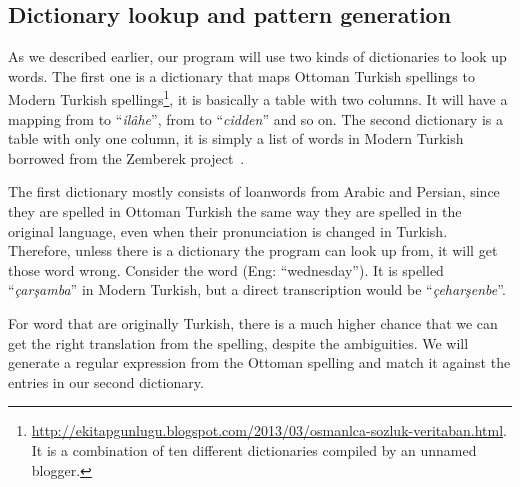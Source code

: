 \documentclass[10pt,twocolumn]{article}
\theoremstyle{nonumberplain}
\newcommand{\otto}[1]{\RLE{\ottoman{}\Large{}#1}}
\newcommand{\word}[1]{``\emph{#1}''}
\begin{document}
\subsection{Dictionary lookup and pattern generation}

As we described earlier, our program will use two kinds of dictionaries to look
up words. The first one is a dictionary that maps Ottoman Turkish spellings to
Modern Turkish spellings\footnote{\url{http://ekitapgunlugu.blogspot.com/2013/03/osmanlca-sozluk-veritaban.html}. It is a combination of ten different dictionaries compiled by an unnamed blogger.}, it is basically a table with two columns.
It will have a mapping from \otto{الهه} to \word{ilâhe}, from \otto{جدا} to
\word{cidden} and so on. The second dictionary is a table with only one column,
it is simply a list of words in Modern Turkish borrowed from the Zemberek project~\cite{akin2007zemberek}.

The first dictionary mostly consists of loanwords from Arabic and Persian, since
they are spelled in Ottoman Turkish the same way they are spelled in the
original language, even when their pronunciation is changed in Turkish.
Therefore, unless there is a dictionary the program can look up from, it will
get those word wrong.
Consider the word \otto{چهارشنبه} (Eng: ``wednesday''). It is spelled
\word{çarşamba} in Modern Turkish, but a direct transcription would be
\word{çeharşenbe}.

For word that are originally Turkish, there is a much higher chance that we can
get the right translation from the spelling, despite the ambiguities.
We will generate a regular expression from the Ottoman spelling and match it
against the entries in our second dictionary.
\end{document}
